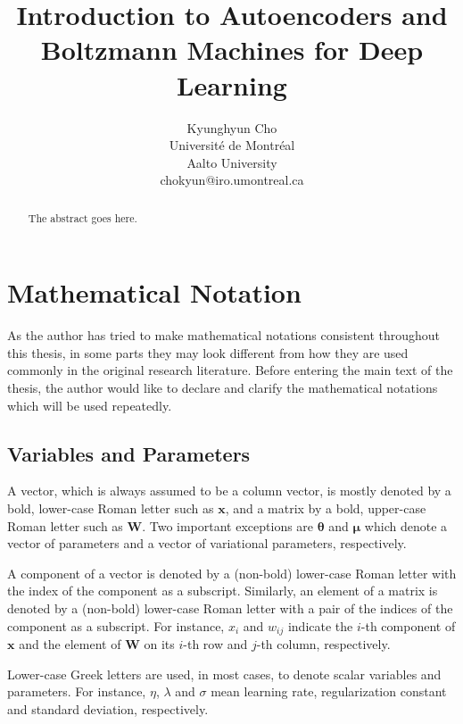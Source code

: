 \documentclass{now}
\title{Introduction to Autoencoders and Boltzmann Machines for Deep Learning}
\author{
    Kyunghyun Cho \\
    Universit\'e de Montr\'eal \\
    Aalto University \\
    chokyun@iro.umontreal.ca \\
}
\newcommand{\vect}[1]{\mathbf{#1}}
\newcommand{\vects}[1]{\boldsymbol{#1}}
\newcommand{\matr}[1]{\mathbf{#1}}
\newcommand{\vx}[0]{\vect{x}}
\newcommand{\mW}[0]{\matr{W}}
\newcommand{\vmu}[0]{\vects{\mu}}
\newcommand{\TT}[0]{{\vects{\theta}}}
\begin{document}

\frontmatter

\maketitle

\tableofcontents

\mainmatter

\begin{abstract}
The abstract goes here.
\end{abstract}

\renewcommand{\nomname}{List of Abbreviations}
%
\setlength{\nomitemsep}{-\parsep}
\printnomenclature[5em]


\chapter*{Mathematical Notation}
%

As the author has tried to make mathematical notations
consistent throughout this thesis, in some parts they may
look different from how they are used commonly in the
original research literature. Before entering the main text
of the thesis, the author would like to declare and clarify
the mathematical notations which will be used repeatedly.

\section*{Variables and Parameters}

A vector, which is always assumed to be a column vector, is
mostly denoted by a bold, lower-case Roman letter such as
$\vx$, and a matrix by a bold, upper-case Roman letter such
as $\mW$. Two important exceptions are $\TT$ and $\vmu$ which denote a
vector of parameters and a vector of variational parameters,
respectively.

A component of a vector is denoted by a (non-bold)
lower-case Roman letter with the index of the component as a
subscript.  Similarly, an element of a matrix is denoted by
a (non-bold) lower-case Roman letter with a pair of the
indices of the component as a subscript. For instance, $x_i$
and $w_{ij}$ indicate the $i$-th component of $\vx$ and the
element of $\mW$ on its $i$-th row and $j$-th column,
respectively.

Lower-case Greek letters are used, in most cases, to denote
scalar variables and parameters. For instance, $\eta$,
$\lambda$ and $\sigma$ mean learning rate, 
regularization constant and standard deviation,
respectively. 
\end{document}
